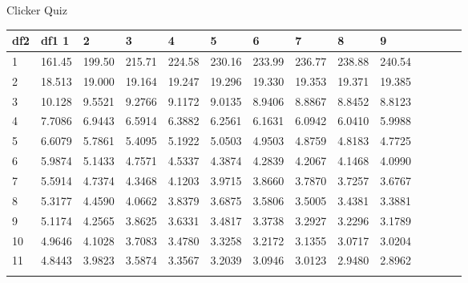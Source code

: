 \begin{frame}{Clicker Quiz}
  \iftoggle{clicker}{%
    \redText{\textbf{Determine the Critical F for $\alpha=0.05$, $df1=2$, and $df2=15$.}}
  }

{\small Approximation of the critical values for the $F$-distribution for $\alpha=0.05$. }
 {
   \fontsize{5pt}{5pt}
   \selectfont
   \begin{tabular}{l|lllllllllllll} 
     df2  & df1      1  &      2  &      3  &      4  &      5  &      6  &      7  &      8  &      9 \\ \hline 
  1 & 161.45 & 199.50 & 215.71 & 224.58 & 230.16 & 233.99 & 236.77 & 238.88 & 240.54 \\[2pt] \arrayrulecolor{light-gray}\hline\arrayrulecolor{black}  
  2 & 18.513 & 19.000 & 19.164 & 19.247 & 19.296 & 19.330 & 19.353 & 19.371 & 19.385 \\[2pt] \arrayrulecolor{light-gray}\hline\arrayrulecolor{black}  
  3 & 10.128 & 9.5521 & 9.2766 & 9.1172 & 9.0135 & 8.9406 & 8.8867 & 8.8452 & 8.8123 \\[2pt] \arrayrulecolor{light-gray}\hline\arrayrulecolor{black}  
  4 & 7.7086 & 6.9443 & 6.5914 & 6.3882 & 6.2561 & 6.1631 & 6.0942 & 6.0410 & 5.9988 \\[2pt] \arrayrulecolor{light-gray}\hline\arrayrulecolor{black}  
  5 & 6.6079 & 5.7861 & 5.4095 & 5.1922 & 5.0503 & 4.9503 & 4.8759 & 4.8183 & 4.7725 \\[2pt] \arrayrulecolor{light-gray}\hline\arrayrulecolor{black}  
  6 & 5.9874 & 5.1433 & 4.7571 & 4.5337 & 4.3874 & 4.2839 & 4.2067 & 4.1468 & 4.0990 \\[2pt] \arrayrulecolor{light-gray}\hline\arrayrulecolor{black}  
  7 & 5.5914 & 4.7374 & 4.3468 & 4.1203 & 3.9715 & 3.8660 & 3.7870 & 3.7257 & 3.6767 \\[2pt] \arrayrulecolor{light-gray}\hline\arrayrulecolor{black}  
  8 & 5.3177 & 4.4590 & 4.0662 & 3.8379 & 3.6875 & 3.5806 & 3.5005 & 3.4381 & 3.3881 \\[2pt] \arrayrulecolor{light-gray}\hline\arrayrulecolor{black}  
  9 & 5.1174 & 4.2565 & 3.8625 & 3.6331 & 3.4817 & 3.3738 & 3.2927 & 3.2296 & 3.1789 \\[2pt] \arrayrulecolor{light-gray}\hline\arrayrulecolor{black}  
 10 & 4.9646 & 4.1028 & 3.7083 & 3.4780 & 3.3258 & 3.2172 & 3.1355 & 3.0717 & 3.0204 \\[2pt] \arrayrulecolor{light-gray}\hline\arrayrulecolor{black}  
 11 & 4.8443 & 3.9823 & 3.5874 & 3.3567 & 3.2039 & 3.0946 & 3.0123 & 2.9480 & 2.8962 \\[2pt] \arrayrulecolor{light-gray}\hline\arrayrulecolor{black}  

\end{tabular}}
\end{frame}
